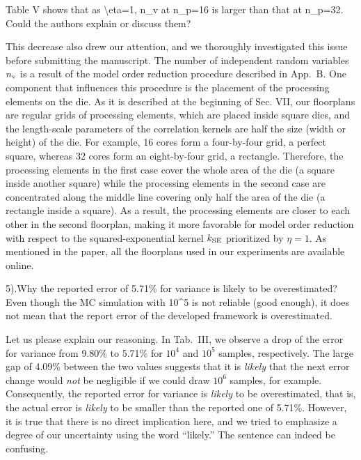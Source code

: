 \begin{reviewer}
Table V shows that as \textbackslash{}eta=1, n\_v at n\_p=16 is larger than that at n\_p=32. Could the authors explain or discuss them?
\end{reviewer}
\begin{authors}
This decrease also drew our attention, and we thoroughly investigated this issue before submitting the manuscript.
The number of independent random variables ${n_\text{v}}$ is a result of the model order reduction procedure described in App.~B.
One component that influences this procedure is the placement of the processing elements on the die.
As it is described at the beginning of Sec. VII, our floorplans are regular grids of processing elements, which are placed inside square dies, and the length-scale parameters of the correlation kernels are half the size (width or height) of the die.
For example, 16 cores form a four-by-four grid, a perfect square, whereas 32 cores form an eight-by-four grid, a rectangle.
Therefore, the processing elements in the first case cover the whole area of the die (a square inside another square) while the processing elements in the second case are concentrated along the middle line covering only half the area of the die (a rectangle inside a square).
As a result, the processing elements are closer to each other in the second floorplan, making it more favorable for model order reduction with respect to the squared-exponential kernel $\fCorr_\SE$ prioritized by $\eta = 1$.
As mentioned in the paper, all the floorplans used in our experiments are available online.

\end{authors}

\begin{reviewer}
5).Why the reported error of 5.71\% for variance is likely to be overestimated? Even though the MC simulation with 10\^{}5 is not reliable (good enough), it does not mean that the report error of the developed framework is overestimated.
\end{reviewer}
\begin{authors}
Let us please explain our reasoning.
In Tab.~III, we observe a drop of the error for variance from 9.80\% to 5.71\% for $10^4$ and $10^5$ samples, respectively.
The large gap of 4.09\% between the two values suggests that it is \emph{likely} that the next error change would \emph{not} be negligible if we could draw $10^6$ samples, for example.
Consequently, the reported error for variance is \emph{likely} to be overestimated, that is, the actual error is \emph{likely} to be smaller than the reported one of 5.71\%.
However, it is true that there is no direct implication here, and we tried to emphasize a degree of our uncertainty using the word ``likely.''
The sentence can indeed be confusing.

\end{authors}

